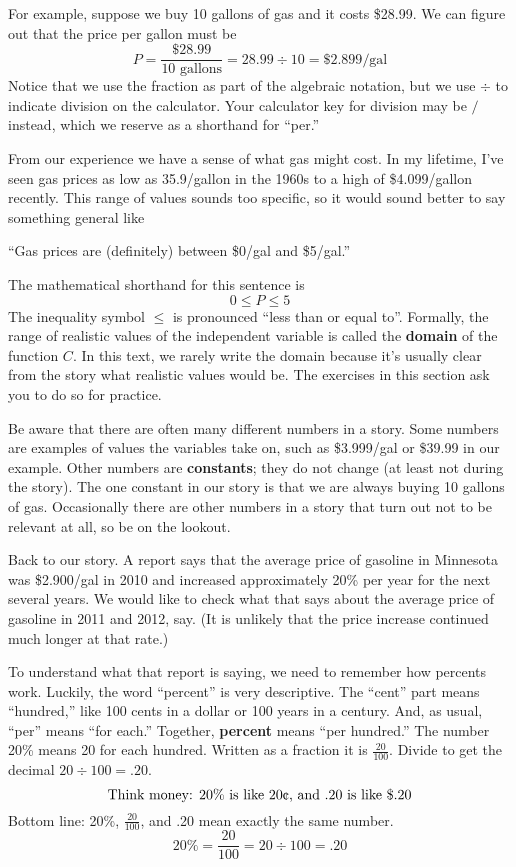 For example, suppose we buy 10 gallons of gas and it costs \$28.99.  We can figure out that the price per gallon must be
$$P=\frac{\$28.99}{10 \text{ gallons}}= 28.99 \div 10 = \$2.899 \text{/gal}$$  Notice that we use the fraction as part of the algebraic notation, but we use $\div$ to indicate division on the calculator.  Your calculator key for division may be $/$ instead, which we reserve as a shorthand for ``per.''

From our experience we have a sense of what gas might cost.  In my lifetime, I've seen gas prices as low as 35.9\textcent \hspace{.05in}/gallon in the 1960s to a high of \$4.099/gallon recently.  This range of values sounds too specific, so it would sound better to say something general like \begin{center} ``Gas prices are (definitely) between \$0/gal and \$5/gal.'' \end{center} 
The mathematical shorthand for this sentence is $$0 \le P \le 5$$  The inequality symbol $\le$ is pronounced ``less than or equal to''.  Formally, the range of realistic values of the independent variable is called the \textbf{domain} of the function $C$.  In this text, we rarely write the domain because it's usually clear from the story what realistic values would be.  The exercises in this section ask you to do so for practice.

Be aware that there are often many different numbers in a story.  Some numbers are examples of values the variables take on, such as \$3.999/gal or \$39.99 in our example.  Other numbers are \textbf{constants}; they do not change (at least not during the story).  The one constant in our story is that we are always buying 10 gallons of gas.  Occasionally there are other numbers in a story that turn out not to be relevant at all, so be on the lookout.

Back to our story.  A report says that the average price of gasoline in Minnesota was  \$2.900/gal in 2010 and increased approximately 20\% per year for the next several years.  We would like to check what that says about the average price of gasoline in 2011 and 2012, say.  (It is unlikely that the price increase continued much longer at that rate.)

To understand what that report is saying, we need to remember how percents work.  Luckily, the word ``percent'' is very descriptive.  The ``cent'' part means ``hundred,'' like 100 cents in a dollar or 100 years in a century.  And, as usual, ``per'' means ``for each.''  Together, \textbf{percent} means ``per hundred.''  The number 20\% means 20 for each hundred.  Written as a fraction it is $\frac{20}{100}$.  Divide to get the decimal $20 \div 100 = .20.$   
$$\text{Think money:  }20\%\text{ is like }20\text{\textcent , and }.20\text{ is like }\$.20$$  
Bottom line:  20\%, $\frac{20}{100}$, and .20 mean exactly the same number.
$$20\% = \frac{20}{100} = 20 \div 100 = .20$$

